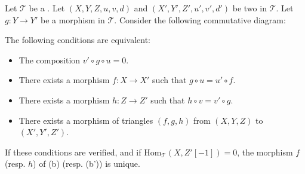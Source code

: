 \begin{proposition} \label{proposition:equivalent_conditions_for_a_morphisms_of_middle_terms_of_two_distinguished_triangles_in_a_triangulated_category_to_extend_to_triangles}
Let $\mathcal{T}$ be a . Let $(X, Y, Z, u, v, d)$ and $(X', Y', Z', u', v', d')$ be two  in $\mathcal{T}$. Let $g: Y \to Y'$ be a morphism in $\mathcal{T}$. Consider the following commutative diagram:
\begin{center}
\end{center}
The following conditions are equivalent:
\begin{itemize}
    \item[(a)] The composition $v' \circ g \circ u = 0$.
    \item[(b)] There exists a morphism $f: X \to X'$ such that $g \circ u = u' \circ f$.
    \item[(b')] There exists a morphism $h: Z \to Z'$ such that $h \circ v = v' \circ g$.
    \item[(c)] There exists a morphism of triangles $(f, g, h)$ from $(X, Y, Z)$ to $(X', Y', Z')$.
\end{itemize}
If these conditions are verified, and if $\text{Hom}_{\mathcal{T}}(X, Z'[-1]) = 0$, the morphism $f$ (resp. $h$) of (b) (resp. (b')) is unique.
\end{proposition}